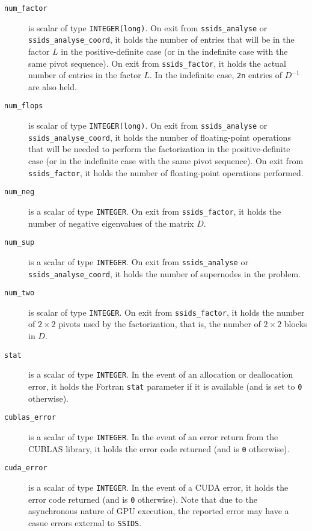 \documentclass{spral}
\begin{document}
\begin{description}
\item[\texttt{num\_factor}] is scalar of type {\tt INTEGER(long)}. On exit from
{\tt ssids\_analyse}  or {\tt ssids\_analyse\_coord}, it holds the number of entries that will be in the
factor $L$ in the positive-definite case (or in the indefinite case with
the same pivot sequence). On exit from
{\tt ssids\_factor},
it holds the actual number of entries in the factor
$L$. In the indefinite case, {\tt 2n} entries of ${D}^{-1}$ are
also held.

\item[\texttt{num\_flops}] is scalar of type {\tt INTEGER(long)}. On exit from
{\tt ssids\_analyse}  or {\tt ssids\_analyse\_coord}, it holds the number of
floating-point operations that
will be needed to perform the factorization
in the positive-definite case (or in the indefinite case  with
the same pivot sequence).  On exit from {\tt ssids\_factor}, it holds the
number of floating-point operations performed.

\item[\texttt{num\_neg}] is a scalar  of type  {\tt INTEGER}.
On exit from {\tt ssids\_factor}, it holds
the number of negative eigenvalues of the matrix $D$.


\item[\texttt{num\_sup}] is a scalar of type  {\tt INTEGER}.
On exit from {\tt ssids\_analyse}  or {\tt ssids\_analyse\_coord}, it holds
the number of supernodes in the problem.

\item[\texttt{num\_two}] is scalar of type  {\tt INTEGER}.
On exit from
{\tt ssids\_factor}, it holds the number
of $2 \times 2$ pivots used by the factorization, that is,
the number of $2 \times 2$ blocks in $D$.

\item[\texttt{stat}] is a scalar of type  {\tt INTEGER}.
In the event of an allocation or deallocation error, it
holds the Fortran {\tt stat} parameter if it is available
(and is set to {\tt 0} otherwise).

\item[\texttt{cublas\_error}] is a scalar of type {\tt INTEGER}.
In the event of an error return from the CUBLAS library, it
holds the error code returned (and is {\tt 0} otherwise).

\item[\texttt{cuda\_error}] is a scalar of type {\tt INTEGER}.
In the event of a CUDA error, it holds the error code returned (and is {\tt 0}
otherwise). Note that due to the asynchronous nature of GPU execution, the
reported error may have a casue errors external to {\tt SSIDS}.

\end{description}
\end{document}
